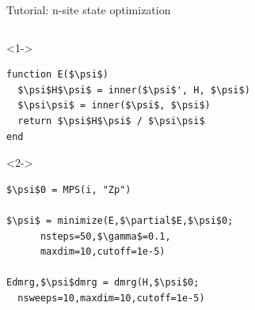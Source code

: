 \begin{frame}[fragile]{Tutorial: n-site state optimization}

\begin{columns}

\begin{column}{5cm}

\begin{onlyenv}<1->
\begin{lstlisting}[language=JuliaLocal, style=julia, mathescape, basicstyle=\scriptsize\ttfamily]
function E($\psi$)
  $\psi$H$\psi$ = inner($\psi$', H, $\psi$)
  $\psi\psi$ = inner($\psi$, $\psi$)
  return $\psi$H$\psi$ / $\psi\psi$
end
\end{lstlisting}
\end{onlyenv}

\begin{onlyenv}<2->
\begin{lstlisting}[language=JuliaLocal, style=julia, mathescape, basicstyle=\scriptsize\ttfamily]
$\psi$0 = MPS(i, "Zp")

$\psi$ = minimize(E,$\partial$E,$\psi$0;
      nsteps=50,$\gamma$=0.1,
      maxdim=10,cutoff=1e-5)

Edmrg,$\psi$dmrg = dmrg(H,$\psi$0;
  nsweeps=10,maxdim=10,cutoff=1e-5)
\end{lstlisting}
\end{onlyenv}

\end{column}

\begin{column}{5.5cm}



\end{column}
\end{columns}
\end{frame}

